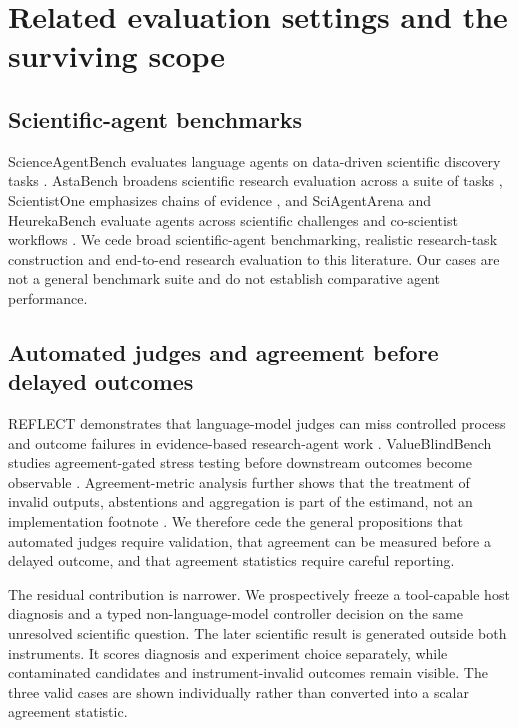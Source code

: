 \documentclass[10pt]{article}
\begin{document}
\section{Related evaluation settings and the surviving scope}

\subsection{Scientific-agent benchmarks}

ScienceAgentBench evaluates language agents on data-driven scientific discovery tasks \citep{chen2025scienceagentbench}. AstaBench broadens scientific research evaluation across a suite of tasks \citep{bragg2025astabench}, ScientistOne emphasizes chains of evidence \citep{meng2026scientistone}, and SciAgentArena and HeurekaBench evaluate agents across scientific challenges and co-scientist workflows \citep{liu2026sciagentarena,panigrahi2026heurekabench}. We cede broad scientific-agent benchmarking, realistic research-task construction and end-to-end research evaluation to this literature. Our cases are not a general benchmark suite and do not establish comparative agent performance.

\subsection{Automated judges and agreement before delayed outcomes}

REFLECT demonstrates that language-model judges can miss controlled process and outcome failures in evidence-based research-agent work \citep{wang2026reflect}. ValueBlindBench studies agreement-gated stress testing before downstream outcomes become observable \citep{chang2026valueblindbench}. Agreement-metric analysis further shows that the treatment of invalid outputs, abstentions and aggregation is part of the estimand, not an implementation footnote \citep{rao2026agreementmetrics}. We therefore cede the general propositions that automated judges require validation, that agreement can be measured before a delayed outcome, and that agreement statistics require careful reporting.

The residual contribution is narrower. We prospectively freeze a tool-capable host diagnosis and a typed non-language-model controller decision on the same unresolved scientific question. The later scientific result is generated outside both instruments. It scores diagnosis and experiment choice separately, while contaminated candidates and instrument-invalid outcomes remain visible. The three valid cases are shown individually rather than converted into a scalar agreement statistic.
\end{document}
